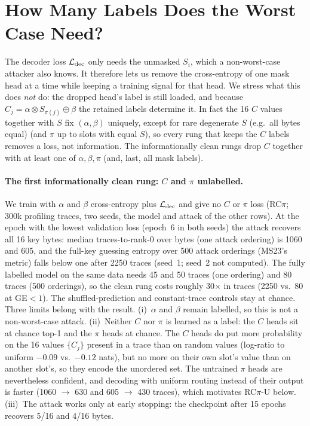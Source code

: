 \section{How Many Labels Does the Worst Case Need?}
\label{sec:ladder}

The decoder loss $\mathcal{L}_{\mathrm{dec}}$ only needs the unmasked $S_i$, which a non-worst-case attacker also knows.
It therefore lets us remove the cross-entropy of one mask head at a time while keeping a training
signal for that head. We stress what this does \emph{not} do: the dropped head's label is still
loaded, and because $C_j = \alpha\otimes S_{\pi(j)}\oplus\beta$ the retained labels determine it. In fact
the 16 $C$ values together with $S$ fix $(\alpha,\beta)$ uniquely, except for rare degenerate $S$ (e.g.\ all
bytes equal) (and $\pi$ up to slots with
equal $S$), so every rung that keeps the $C$ labels removes a loss, not information. The informationally
clean rungs drop $C$ together with at least one of $\alpha,\beta,\pi$ (and, last, all mask labels).

\paragraph{The first informationally clean rung: $C$ and $\pi$ unlabelled.}
We train with $\alpha$ and $\beta$ cross-entropy plus $\mathcal{L}_{\mathrm{dec}}$ and give no $C$ or $\pi$ loss (RC$\pi$; 300k
profiling traces, two seeds, the model and attack of the other rows). At the epoch with the lowest
validation loss (epoch~6 in both seeds) the attack recovers all 16 key bytes: median traces-to-rank-0 over
bytes (one attack ordering) is 1060 and 605, and the full-key guessing entropy over 500 attack orderings
(MS23's metric) falls below one after 2250 traces (seed~1; seed~2 not computed). The fully labelled model on the
same data needs 45 and 50 traces (one ordering) and 80 traces (500 orderings), so the clean rung costs roughly
30$\times$ in traces (2250 vs.\ 80 at GE$<1$). The shuffled-prediction and constant-trace controls stay at chance. Three
limits belong with the result. (i)~$\alpha$ and $\beta$ remain labelled, so this is not a non-worst-case
attack. (ii)~Neither $C$ nor $\pi$ is learned as a label: the $C$ heads sit at chance top-1 and the $\pi$
heads at chance. The $C$ heads do put more probability on the 16 values $\{C_j\}$ present in a trace than
on random values (log-ratio to uniform $-0.09$ vs.\ $-0.12$ nats), but no more on their own slot's value than
on another slot's, so they encode the unordered set. The untrained $\pi$ heads are nevertheless confident,
and decoding with uniform routing instead of their output is faster (1060 $\to$ 630 and 605 $\to$ 430
traces), which motivates RC$\pi$-U below. (iii)~The
attack works only at early stopping: the checkpoint after 15 epochs recovers 5/16 and 4/16 bytes.

